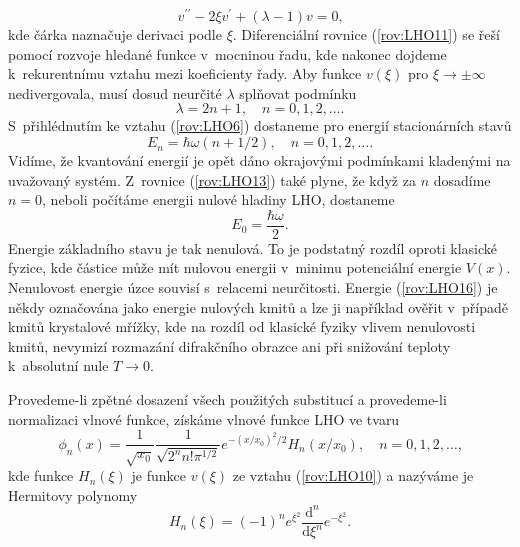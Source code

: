 \begin{equation}
v^{\prime\prime} - 2\xi v^{\prime} + (\lambda - 1)v = 0 \mbox{,}
\label{rov:LHO11}
\end{equation}
kde čárka naznačuje derivaci podle $\xi$. Diferenciální rovnice (\ref{rov:LHO11}) se řeší pomocí rozvoje hledané funkce v~mocninou řadu, kde nakonec dojdeme k~rekurentnímu vztahu mezi koeficienty řady. Aby funkce $v(\xi)$ pro $\xi \rightarrow \pm \infty$ nedivergovala, musí dosud neurčité $\lambda$ splňovat podmínku
\begin{equation}
\lambda = 2n + 1, \quad n=0,1,2, \dots \mbox{.}
\label{rov:LHO12}
\end{equation}
S~přihlédnutím ke vztahu (\ref{rov:LHO6}) dostaneme pro energií stacionárních stavů
\begin{equation}
E_n = \hbar \omega (n+ 1/2), \quad n=0,1,2, \dots \mbox{.}
\label{rov:LHO13}
\end{equation}
Vidíme, že kvantování energií je opět dáno okrajovými podmínkami kladenými na uvažovaný systém. Z~rovnice (\ref{rov:LHO13}) také plyne, že když za $n$ dosadíme $n=0$, neboli počítáme energii nulové hladiny LHO, dostaneme
\begin{equation}
E_0 = \frac{\hbar \omega}{2} \mbox{.}
\label{rov:LHO16}
\end{equation}
Energie základního stavu je tak nenulová. To je podstatný rozdíl oproti klasické fyzice, kde částice může mít nulovou energii v~minimu potenciální energie $V(x)$. Nenulovost energie úzce souvisí s~relacemi neurčitosti. Energie (\ref{rov:LHO16}) je někdy označována jako energie nulových kmitů a lze ji například ověřit v~případě kmitů krystalové mřížky, kde na rozdíl od klasické fyziky vlivem nenulovosti kmitů, nevymizí rozmazání difrakčního obrazce ani při snižování teploty k~absolutní nule $T \rightarrow 0$.

Provedeme-li zpětné dosazení všech použitých substitucí a provedeme-li normalizaci vlnové funkce, získáme vlnové funkce LHO ve tvaru
\begin{equation}
\phi_n(x)=\frac{1}{\sqrt{x_0}}\frac{1}{\sqrt{2^n n! \pi^{1/2}}}e^{-(x/x_0)^2/2}H_n(x/x_0), \quad n=0,1,2, \dots \mbox{,}
\label{rov:LHO14}
\end{equation}
kde funkce $H_n(\xi)$ je funkce $v(\xi)$ ze vztahu (\ref{rov:LHO10}) a nazýváme je Hermitovy polynomy
\begin{equation}
H_n(\xi) = (-1)^n e^{\xi^2} \frac{\mathrm{d}^n}{\mathrm{d}\xi^n}e^{-\xi^2} \mbox{.}
\label{rov:LHO15}
\end{equation}


